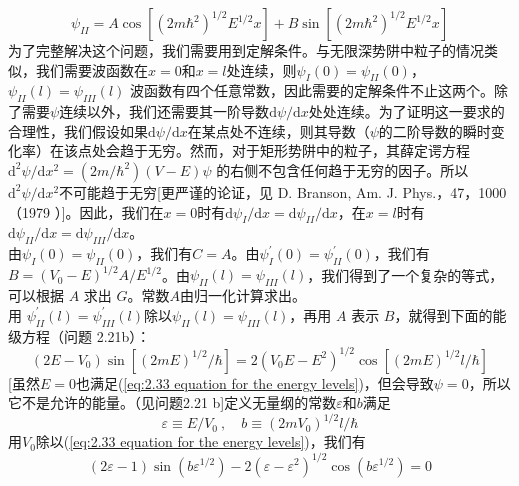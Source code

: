 	\begin{equation}
		\psi_{II} = A \cos\left[\left(2m\hbar^2\right)^{1/2}E^{1/2}x\right]+B\sin \left[\left(2m\hbar^2\right)^{1/2}E^{1/2}x\right]
		\label{eq:2.32}
	\end{equation}
	\indent 为了完整解决这个问题，我们需要用到定解条件。与无限深势阱中粒子的情况类似，我们需要波函数在$x=0$和$x=l$处连续，则$\psi_I\left(0\right) = \psi_{II}\left(0\right)$，$\psi_{II}\left(l\right) = \psi_{III}\left(l\right)$
	波函数有四个任意常数，因此需要的定解条件不止这两个。除了需要$\psi$连续以外，我们还需要其一阶导数$\mathrm{d}\psi/\mathrm{d}x$处处连续。为了证明这一要求的合理性，我们假设如果$\mathrm{d}\psi/\mathrm{d}x$在某点处不连续，则其导数（$\psi$的二阶导数的瞬时变化率）在该点处会趋于无穷。然而，对于矩形势阱中的粒子，其薛定谔方程$\mathrm{d}^2\psi/\mathrm{d}x^2=\left(2m/\hbar^2\right)\left(V-E\right)\psi$
	的右侧不包含任何趋于无穷的因子。所以$\mathrm{d}^2\psi/\mathrm{d}x^2$不可能趋于无穷[更严谨的论证，见 D. Branson, Am. J. Phys.，47，1000（1979 ）]。因此，我们在$x=0$时有$\mathrm{d}\psi_I/\mathrm{d}x=\mathrm{d}\psi_{II}/\mathrm{d}x$，在$x=l$时有$\mathrm{d}\psi_{II}/\mathrm{d}x=\mathrm{d}\psi_{III}/\mathrm{d}x$。\\
	\indent 由$\psi_I\left(0\right) = \psi_{II}\left(0\right)$，我们有$C=A$。由$\psi_I^{\prime}\left(0\right) = \psi_{II}^{\prime}\left(0\right)$，我们有$B=\left(V_0-E\right)^{1/2}A/E^{1/2}$。由$\psi_{II}\left(l\right) = \psi_{III}\left(l\right)$，我们得到了一个复杂的等式，可以根据 $A$ 求出 $G$。常数$A$由归一化计算求出。\\
	\indent 用 $\psi^{\prime}_{II}\left(l\right) = \psi^{\prime}_{III}\left(l\right)$除以$\psi_{II}\left(l\right) = \psi_{III}\left(l\right)$，再用 $A$ 表示 $B$，就得到下面的能级方程（问题 2.21b）：
	\begin{equation}
		\left(2E-V_0\right)\sin\left[\left(2mE\right)^{1/2}/\hbar\right] = 2\left(V_0E-E^2\right)^{1/2}\cos \left[\left(2mE\right)^{1/2}l/\hbar\right]
		\label{eq:2.33 equation for the energy levels}
	\end{equation}
	[虽然$E=0$也满足(\ref{eq:2.33 equation for the energy levels})，但会导致$\psi=0$，所以它不是允许的能量。（见问题2.21 b]定义无量纲的常数$\varepsilon$和$b$满足
	\begin{equation}
		\varepsilon \equiv E/V_0\:, \quad b \equiv \left(2mV_0\right)^{1/2}l/\hbar
		\label{eq: 2.34 definition of varepsilon and b}
	\end{equation}
	用$V_0$除以(\ref{eq:2.33 equation for the energy levels})，我们有
	\begin{equation}
		\left(2\varepsilon-1\right)\sin\left(b\varepsilon^{1/2}\right) - 2\left(\varepsilon - \varepsilon^2 \right)^{1/2}\cos\left(b\varepsilon^{1/2}\right) = 0
		\label{eq:2.35 equation for the energy levels with varepsilon and b}
	\end{equation}
